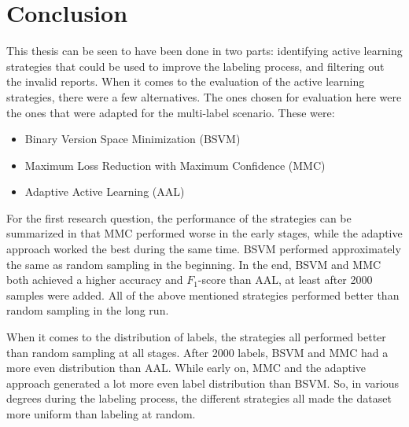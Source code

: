 
\chapter{Conclusion}
\label{cha:conclusion}

This thesis can be seen to have been done in two parts: identifying active learning strategies that could be used to improve the labeling process, and filtering out the invalid reports.
When it comes to the evaluation of the active learning strategies, there were a few alternatives.
The ones chosen for evaluation here were the ones that were adapted for the multi-label scenario.
These were: 
\begin{itemize}
    \item Binary Version Space Minimization (BSVM)
    \item Maximum Loss Reduction with Maximum Confidence (MMC)
    \item Adaptive Active Learning (AAL)
\end{itemize}

For the first research question, the performance of the strategies can be summarized in that MMC performed worse in the early stages, while the adaptive approach worked the best during the same time.
BSVM performed approximately the same as random sampling in the beginning.
In the end, BSVM and MMC both achieved a higher accuracy and $F_1$-score than AAL, at least after 2000 samples were added.
All of the above mentioned strategies performed better than random sampling in the long run.

When it comes to the distribution of labels, the strategies all performed better than random sampling at all stages.
After 2000 labels, BSVM and MMC had a more even distribution than AAL.
While early on, MMC and the adaptive approach generated a lot more even label distribution than BSVM.
So, in various degrees during the labeling process, the different strategies all made the dataset more uniform than labeling at random.

